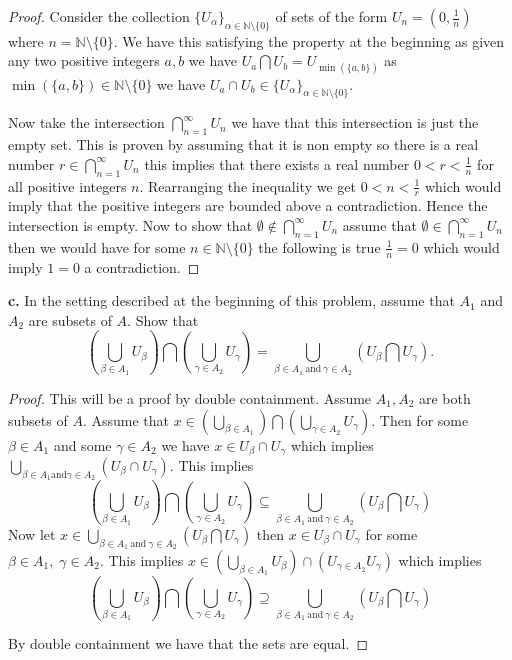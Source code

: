 \documentclass{amsart}
\theoremstyle{plain}
\theoremstyle{definition}
\theoremstyle{remark}
\begin{document}
\begin{proof}
    Consider the collection $\{U_\alpha\}_{\alpha \in \mathbb{N}\setminus \{0\}}$ of sets of the form $U_n=(0,\frac{1}{n})$ where $n=\mathbb{N}\setminus\{0\}$. We have this satisfying the property at the beginning as given any two positive integers $a,b$ we have $U_a\bigcap U_b=U_{\min(\{a,b\})}$ as $\min(\{a,b\})\in \mathbb{N}\setminus\{0\}$ we have $ U_a\cap U_b\in \{U_\alpha\}_{\alpha \in \mathbb{N}\setminus \{0\}}$. 

    Now take the intersection $\bigcap_{n=1}^\infty U_n$ we have that this intersection is just the empty set. This is proven by assuming that it is non empty so there is a real number $r\in \bigcap_{n=1}^{\infty}U_n$ this implies that there exists a real number $0<r<\frac{1}{n}$ for all positive integers $n$. Rearranging the inequality we get $0<n<\frac{1}{r}$  which would imply that the positive integers are bounded above a contradiction. Hence the intersection is empty. Now to show that $\emptyset \not \in \bigcap_{n=1}^\infty U_n$ assume that $\emptyset \in \bigcap_{n=1}^\infty U_n$ then we would have for some $n\in \mathbb{N}\setminus \{0\}$ the following is true $\frac{1}{n}=0$ which would imply $1=0$ a contradiction. 
    
\end{proof}

\vspace{.1in}





{\bfseries c.} In the setting described at the beginning of this problem, assume that $A_1$ and $A_2$ are subsets of $A$. Show that
\[
    \left( \bigcup _{\beta \in A_1} U_{\beta} \right) \bigcap \left( \bigcup _{\gamma \in A_2} U_{\gamma} \right) = \bigcup _{\beta \in A_1 \ \mbox{and} \ \gamma \in A_2} (U_{\beta} \bigcap U_{\gamma}).
\]

\begin{proof}
    This will be a proof by double containment. Assume $A_1,A_2$ are both subsets of $A$.
    Assume that $x\in \left( \bigcup_{\beta \in A_1}\right) \bigcap \left( \bigcup_{\gamma \in A_2}U_{\gamma}\right)$. Then for some $\beta \in A_1$ and some $\gamma \in A_2$ we have $x\in U_\beta \cap U_\gamma$ which implies $\bigcup _{\beta \in A_1 \text{and} \gamma \in A_2}(U_\beta \cap U_\gamma)$. This implies \[
        \left( \bigcup _{\beta \in A_1} U_{\beta} \right) \bigcap \left( \bigcup _{\gamma \in A_2} U_{\gamma} \right) \subseteq \bigcup _{\beta \in A_1 \ \mbox{and} \ \gamma \in A_2} (U_{\beta} \bigcap U_{\gamma})
        \]
    Now let $x\in \bigcup _{\beta \in A_1 \ \mbox{and} \ \gamma \in A_2} (U_{\beta} \bigcap U_{\gamma})$ then $x\in U_\beta \cap U_\gamma$ for some $\beta \in A_1, \; \gamma \in A_2$. This implies $x\in \left( \bigcup_{\beta \in A_1} U_\beta\right)\cap \left(U_{\gamma \in A_2}U_\gamma\right)$ which implies \[   \left( \bigcup _{\beta \in A_1} U_{\beta} \right) \bigcap \left( \bigcup _{\gamma \in A_2} U_{\gamma} \right) \supseteq \bigcup _{\beta \in A_1 \ \mbox{and} \ \gamma \in A_2} (U_{\beta} \bigcap U_{\gamma})\]

    By double containment we have that the sets are equal. 

\end{proof}
\end{document}
